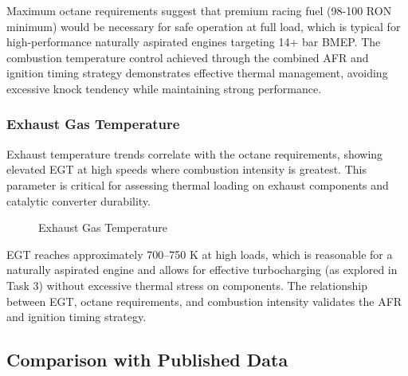 Maximum octane requirements suggest that premium racing fuel (98-100 RON minimum) would be necessary for safe operation at full load, which is typical for high-performance naturally aspirated engines targeting 14+ bar BMEP. The combustion temperature control achieved through the combined AFR and ignition timing strategy demonstrates effective thermal management, avoiding excessive knock tendency while maintaining strong performance.

\subsubsection{Exhaust Gas Temperature}

Exhaust temperature trends correlate with the octane requirements, showing elevated EGT at high speeds where combustion intensity is greatest. This parameter is critical for assessing thermal loading on exhaust components and catalytic converter durability.

\begin{figure}[H]
    \centering
    \begin{minipage}{\textwidth}
        \centering
        \caption{Exhaust Gas Temperature}
        \label{fig:task2_exhaust_temp_detail}
    \end{minipage}
\end{figure}

EGT reaches approximately 700--750 K at high loads, which is reasonable for a naturally aspirated engine and allows for effective turbocharging (as explored in Task 3) without excessive thermal stress on components. The relationship between EGT, octane requirements, and combustion intensity validates the AFR and ignition timing strategy.

\subsection{Comparison with Published Data}

